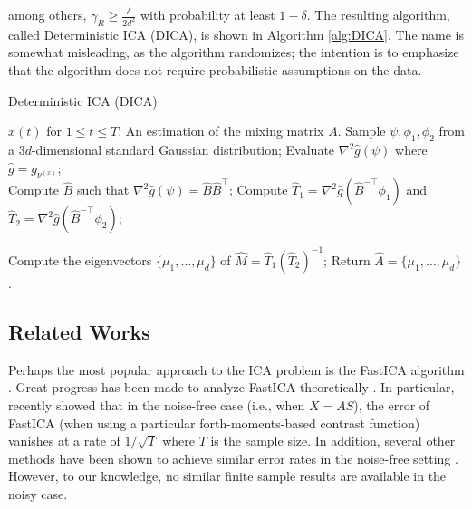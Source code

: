 \documentclass{article} %
\theoremstyle{definition}
\begin{document}
among others,  $\gamma_R \ge\frac{\delta}{2d^2}$ with probability at least $1-\delta$.
The resulting algorithm, called Deterministic ICA (DICA), is shown in Algorithm \ref{alg:DICA}. 
The name is somewhat misleading, as the algorithm randomizes; the intention is to emphasize that the algorithm does not require probabilistic assumptions on the data.
\begin{algorithm}
\caption{Deterministic ICA (DICA)}
\label{alg:DICA}
\begin{algorithmic}[1]
\INPUT $x(t)$ for $1\le t \le T$. 
\OUTPUT An estimation of the mixing matrix $A$. 
\STATE Sample $\psi, \phi_1, \phi_2$ from a $3d$-dimensional standard Gaussian distribution;
\STATE Evaluate $\nabla^2 \hat{g}(\psi)$ where $\hat{g} = g_{\nu^{(x)}}$; \\
\STATE Compute $\hat{B}$ such that $\nabla^2\hat{g}(\psi) = \hat{B}\hat{B}^{\top}$;
\STATE Compute $\hat{T}_1 =\nabla^2\hat{g}(\hat{B}^{-\top}\phi_1)$ and  $\hat{T}_2 =\nabla^2\hat{g}(\hat{B}^{-\top}\phi_2)$;

\STATE Compute the eigenvectors $\{\mu_1,\ldots,\mu_d\}$ of $\hat{M} = \hat{T}_1\left(\hat{T}_2\right)^{-1}$;
\STATE Return $\hat{A} = \{\mu_1,\ldots,\mu_d\}$.
\end{algorithmic}
\end{algorithm}

\subsection{Related Works}
\label{subsec:relatedWorks}
Perhaps the most popular approach to the ICA problem is the FastICA algorithm \citep{hyvarinen1999fast}. 
Great progress has been made to analyze FastICA theoretically \citep{tichavsky2006performance,oja2006fastica,ollila2010deflation,dermoune2013fastica,wei2014convergence}.
In particular, recently \citet{miettinen2014fourth} showed that in the noise-free case (i.e., when $X = AS$), the error of FastICA (when using a particular forth-moments-based contrast function) vanishes at a rate of $1/\sqrt{T}$ where $T$ is the sample size.
In addition, several other methods have been shown to achieve similar error rates in the noise-free setting \citep[e.g.,][]{eriksson2003characteristic,samarov2004nonparametric,chen2005consistent,chen2006efficient}.
However, to our knowledge, no similar finite sample results are available in the noisy case.
\end{document}
